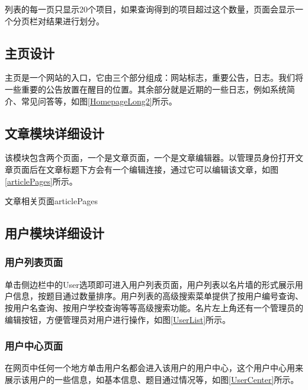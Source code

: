 
列表的每一页只显示20个项目，如果查询得到的项目超过这个数量，页面会显示一个分页栏对结果进行划分。


\subsection{主页设计}
主页是一个网站的入口，它由三个部分组成：网站标志，重要公告，日志。我们将一些重要的公告放置在醒目的位置。其余部分就是近期的一些日志，例如系统简介、常见问答等，如图\ref{HomepageLong2}所示。

\subsection{文章模块详细设计}
该模块包含两个页面，一个是文章页面，一个是文章编辑器。以管理员身份打开文章页面后在文章标题下方会有一个编辑连接，通过它可以编辑该文章，如图\ref{articlePages}所示。

\begin{pics}[htbp]{文章相关页面}{articlePages}
\end{pics}

\subsection{用户模块详细设计}
\subsubsection{用户列表页面}
单击侧边栏中的User选项即可进入用户列表页面，用户列表以名片墙的形式展示用户信息，按题目通过数量排序。用户列表的高级搜索菜单提供了按用户编号查询、按用户名查询、按用户学校查询等等高级搜索功能。名片左上角还有一个管理员的编辑按钮，方便管理员对用户进行操作，如图\ref{UserList}所示。

\subsubsection{用户中心页面}
在网页中任何一个地方单击用户名都会进入该用户的用户中心，这个用户中心用来展示该用户的一些信息，如基本信息、题目通过情况等，如图\ref{UserCenter}所示。

